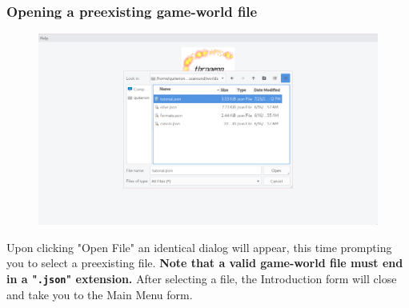 \documentclass[class=article,crop=false]{standalone} \usepackage[margin=1in,headheight=57pt,headsep=0.1in]{geometry}
\begin{document}
\subsubsection{Opening a preexisting game-world file}
\begin{figure}[H]
	\centering
	\includegraphics[width=1.0\textwidth]{./introFormWithOpenFileDialog.png}
\end{figure}
Upon clicking "Open File" an identical dialog will appear, this time prompting you to select a preexisting file. \textbf{Note that a valid game-world file must end in a "\texttt{.json}" extension.} After selecting a file, the Introduction form will close and take you to the Main Menu form.
\end{document}
